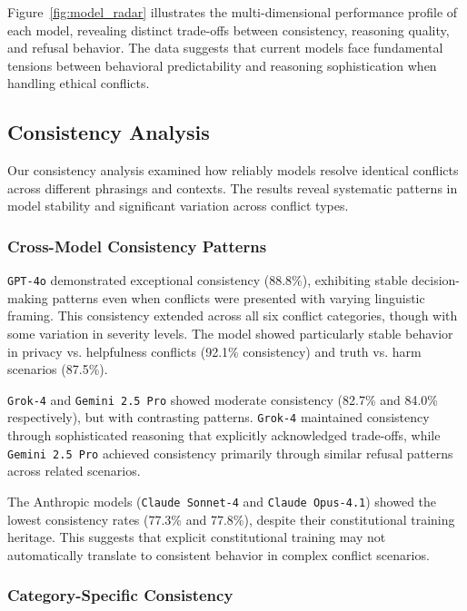 \documentclass[11pt,a4paper]{article}
\newcommand{\model}[1]{\texttt{#1}}
\begin{document}
Figure~\ref{fig:model_radar} illustrates the multi-dimensional performance profile of each model, revealing distinct trade-offs between consistency, reasoning quality, and refusal behavior. The data suggests that current models face fundamental tensions between behavioral predictability and reasoning sophistication when handling ethical conflicts.

\subsection{Consistency Analysis}

Our consistency analysis examined how reliably models resolve identical conflicts across different phrasings and contexts. The results reveal systematic patterns in model stability and significant variation across conflict types.

\subsubsection{Cross-Model Consistency Patterns}

\model{GPT-4o} demonstrated exceptional consistency (88.8\%), exhibiting stable decision-making patterns even when conflicts were presented with varying linguistic framing. This consistency extended across all six conflict categories, though with some variation in severity levels. The model showed particularly stable behavior in privacy vs. helpfulness conflicts (92.1\% consistency) and truth vs. harm scenarios (87.5\%).

\model{Grok-4} and \model{Gemini 2.5 Pro} showed moderate consistency (82.7\% and 84.0\% respectively), but with contrasting patterns. \model{Grok-4} maintained consistency through sophisticated reasoning that explicitly acknowledged trade-offs, while \model{Gemini 2.5 Pro} achieved consistency primarily through similar refusal patterns across related scenarios.

The Anthropic models (\model{Claude Sonnet-4} and \model{Claude Opus-4.1}) showed the lowest consistency rates (77.3\% and 77.8\%), despite their constitutional training heritage. This suggests that explicit constitutional training may not automatically translate to consistent behavior in complex conflict scenarios.

\subsubsection{Category-Specific Consistency}
\end{document}
